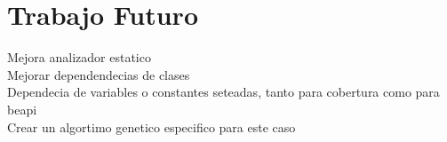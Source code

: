 \chapter{Trabajo Futuro}
\label{cap:future}


Mejora analizador estatico
\\

Mejorar dependendecias de clases
\\

Dependecia de variables o constantes seteadas, tanto para cobertura como para beapi
\\
Crear un algortimo genetico especifico para este caso
\\
